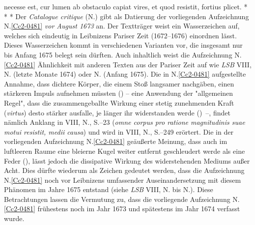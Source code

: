 necesse est,
cur lumen ab obstaculo%
capiat vires,%
et quod resistit,
fortius plicet.
\pend%
\vspace{3.0em}%
\pstart%
\noindent%
\centering%
*     *     *
\pend%
\vspace{3.0em}%
%
\frenchspacing%
\footnotesize%
\pstart%
\noindent%
%
Der \textit{Catalogue critique} (N.) gibt als Datierung der vorliegenden Aufzeichnung N.\;\ref{Cc2-0481} \textit{vor August 1673} an.
Der Textträger weist ein Wasserzeichen auf, welches sich eindeutig in Leibnizens Pariser Zeit (1672--1676) einordnen lässt. %
Dieses Wasserzeichen kommt in verschiedenen Varianten vor, die insgesamt nur bis Anfang 1675 belegt sein dürften.
Auch inhaltlich weist die Aufzeichnung N.\;\ref{Cc2-0481} Ähnlichkeit mit anderen Texten aus der Pariser Zeit auf wie \textit{LSB} VIII, %
N. (letzte Monate 1674)\cite{01292} oder N. (Anfang 1675)\cite{01359}.
Die in N.\;\ref{Cc2-0481} aufgestellte Annahme, dass dichtere Körper, die einem Stoß langsamer nachgäben, einen stärkeren Impuls aufnehmen müssten () -- eine Anwendung der "allgemeinen Regel", dass die zusammengeballte Wirkung einer stetig zunehmenden Kraft (\textit{virtus}) desto stärker ausfalle, je länger ihr widerstanden werde ()~--, findet nämlich Anklang in VIII, N., S.--23\cite{01292} (\textit{omne corpus pro ratione magnitudinis suae motui resistit, medii causa}) und wird in VIII, N., S.--249\cite{01359} erörtert.
Die in der vorliegenden Aufzeichnung N.\;\ref{Cc2-0481} geäußerte Meinung, dass auch im luftleeren Raume eine bleierne Kugel weiter entfernt geschleudert werde als eine Feder  (), lässt jedoch die dissipative Wirkung des widerstehenden Mediums außer Acht.
Dies dürfte wiederum als Zeichen gedeutet werden, dass die Aufzeichnung N.\;\ref{Cc2-0481} noch vor Leibnizens umfassender Auseinandersetzung mit diesem Phänomen im Jahre 1675 entstand (siehe \textit{LSB} VIII, N. bis N.).\cite{01359}\cite{01360}\cite{01361}\cite{01362}\cite{01345}\cite{01364}\cite{01365}\cite{01366}\cite{01367}\cite{01368}\cite{01369}\cite{01370}\cite{01371}\cite{01372}\cite{01373}
Diese Betrachtungen lassen die Vermutung zu, dass die vorliegende Aufzeichnung N.\;\ref{Cc2-0481} frühestens noch im Jahr 1673 und spätestens im Jahr 1674 verfasst wurde.%
\pend%
%
\frenchspacing%
\normalsize%
